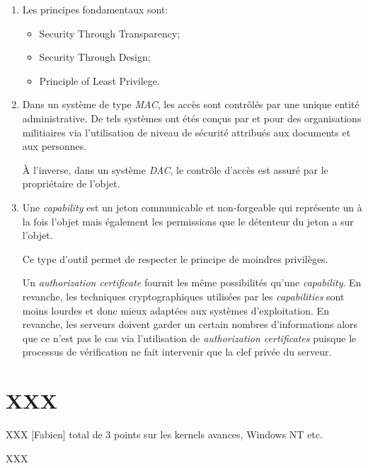 \begin{correction}

\begin{enumerate}
  \item
    Les principes fondamentaux sont:

    \begin{itemize}
      \item
        Security Through Transparency;
      \item
        Security Through Design;
      \item
        Principle of Least Privilege.
    \end{itemize}
  \item
    Dans un syst\`eme de type \textit{MAC}, les acc\`es sont contr\^ol\'es
    par une unique entit\'e administrative. De tels syst\`emes ont \'et\'es
    con\c{c}us par et pour des organisations militiaires via l'utilisation
    de niveau de s\'ecurit\'e attribu\'es aux documents et aux personnes.

    \`A l'inverse, dans un syst\`eme \textit{DAC}, le contr\^ole d'acc\`es
    est assur\'e par le propri\'etaire de l'objet.
  \item
    Une \textit{capability} est un jeton communicable et non-forgeable qui
    repr\'esente un \`a la fois l'objet mais \'egalement les permissions
    que le d\'etenteur du jeton a sur l'objet.

    Ce type d'outil permet de respecter le principe de moindres privil\`eges.

    Un \textit{authorization certificate} fournit les m\^eme possibilit\'es
    qu'une \textit{capability}. En revanche, les techniques cryptographiques
    utilis\'ees par les \textit{capabilities} sont moins lourdes et donc mieux
    adapt\'ees aux syst\`emes d'exploitation. En revanche, les serveurs doivent
    garder un certain nombres d'informations alors que ce n'est pas le cas
    via l'utilisation de \textit{authorization certificates} puisque le
    processus de v\'erification ne fait intervenir que la clef priv\'ee du
    serveur.
\end{enumerate}

\end{correction}

%
%

\section{XXX
         }

XXX [Fabien] total de 3 points sur les kernels avances, Windows NT etc.

\begin{correction}

XXX

\end{correction}


